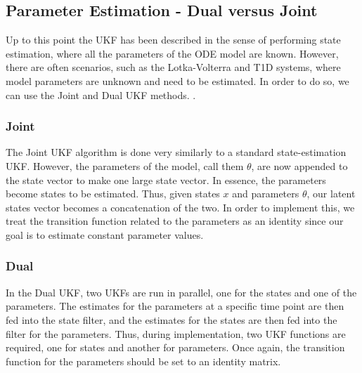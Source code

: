     
\subsection{Parameter Estimation - Dual versus Joint} \label{section:Parameter_Estimation}
Up to this point the UKF has been described in the sense of performing state estimation, where all the parameters of the ODE model are known. However, there are often scenarios, such as the Lotka-Volterra and T1D systems, where model parameters are unknown and need to be estimated. In order to do so, we can use the Joint and Dual UKF methods. \cite{VanMereChapter}.

    \subsubsection{Joint}
    The Joint UKF algorithm is done very similarly to a standard state-estimation UKF. However, the parameters of the model, call them $\theta$, are now appended to the state vector to make one large state vector. In essence, the parameters become states to be estimated. Thus, given states $x$ and parameters $\theta$, our latent states vector becomes a concatenation of the two. In order to implement this, we treat the transition function related to the parameters as an identity since our goal is to estimate constant parameter values. 
    \subsubsection{Dual}
    In the Dual UKF, two UKFs are run in parallel, one for the states and one of the parameters. The estimates for the parameters at a specific time point are then fed into the state filter, and the estimates for the states are then fed into the filter for the parameters. Thus, during implementation, two UKF functions are required, one for states and another for parameters. Once again, the transition function for the parameters should be set to an identity matrix.

